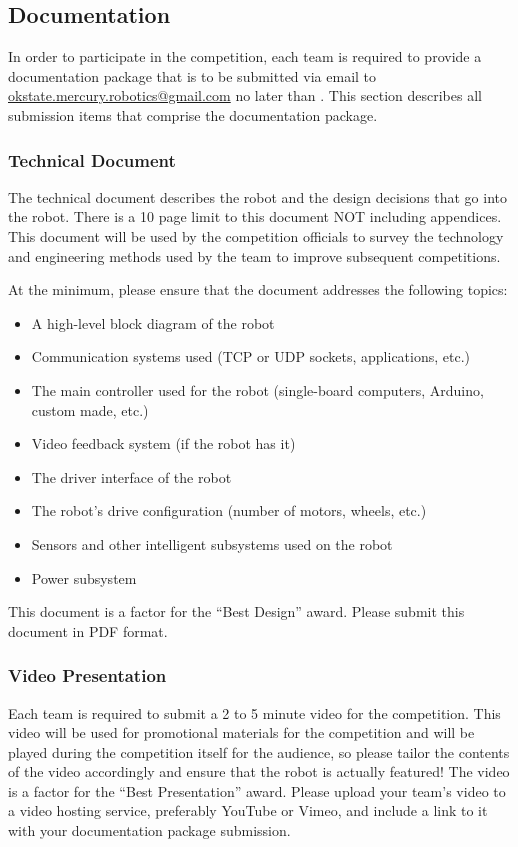 \subsection{Documentation}
In order to participate in the competition, each team is required to provide a documentation package that is to be submitted via email to \href{mailto:okstate.mercury.robotics@gmail.com}{ okstate.mercury.robotics@gmail.com} no later than \textbf{\documentation}. This section describes all submission items that comprise the documentation package.

\subsubsection{Technical Document}
The technical document describes the robot and the design decisions that go into the robot. There is a 10 page limit to this document NOT including appendices. This document will be used by the competition officials to survey the technology and engineering methods used by the team to improve subsequent competitions. 

At the minimum, please ensure that the document addresses the following topics:

\begin{itemize}
\item A high-level block diagram of the robot
\item Communication systems used (TCP or UDP sockets, applications, etc.)
\item The main controller used for the robot (single-board computers, Arduino, custom made, etc.)
\item Video feedback system (if the robot has it)
\item The driver interface of the robot
\item The robot's drive configuration (number of motors, wheels, etc.)
\item Sensors and other intelligent subsystems used on the robot
\item Power subsystem	
\end{itemize}
This document is a factor for the “Best Design” award. Please submit this document in PDF format.
\subsubsection{Video Presentation}
Each team is required to submit a 2 to 5 minute video for the competition. This video will be used for promotional materials for the competition and will be played during the competition itself for the audience, so please tailor the contents of the video accordingly and ensure that the robot is actually featured! The video is a factor for the “Best Presentation” award. Please upload your team’s video to a video hosting service, preferably YouTube or Vimeo, and include a link to it with your documentation package submission.

